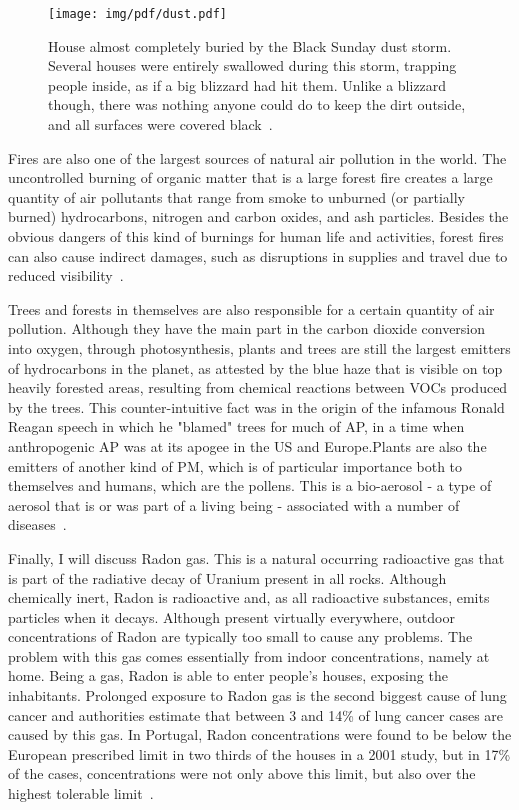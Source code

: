 \begin{figure}[htpb]
    \centering
    \texttt{[image: img/pdf/dust.pdf]}
        \caption{House almost completely buried by the Black Sunday dust
            storm. Several houses were entirely swallowed during this
            storm, trapping people inside, as if a big blizzard had hit
            them. Unlike a blizzard though, there was nothing anyone
            could do to keep the dirt outside, and all surfaces were
            covered black~\cite{Reis2008}.}
    \label{fig:dust1935}
\end{figure}

Fires are also one of the largest sources of natural air pollution in
the world. The uncontrolled burning of organic matter that is a large
forest fire creates a large quantity of air pollutants that range from
smoke to unburned (or partially burned) hydrocarbons, nitrogen and carbon
oxides, and ash particles. Besides the obvious dangers of this kind of
burnings for human life and activities, forest fires can also cause
indirect damages, such as disruptions in supplies and travel due to
reduced visibility~\cite{Vallero2014}.

Trees and forests in themselves are also responsible for a certain
quantity of air pollution. Although they have the main part in the
carbon dioxide conversion into oxygen, through photosynthesis, plants
and trees are still the largest emitters of hydrocarbons in the planet,
as attested by the blue haze that is visible on top heavily forested
areas, resulting from chemical reactions between \gls{VOC}s produced by
the trees. This counter-intuitive fact was in the origin of the infamous
Ronald Reagan speech in which he "blamed" trees for much of \gls{AP}, in
a time when anthropogenic \gls{AP} was at its apogee in the US and
Europe.Plants are also the emitters of another kind of \gls{PM}, which
is of particular importance both to themselves and humans, which are the
pollens. This is a bio-aerosol - a type of aerosol that is or was part
of a living being - associated with a number of
diseases~\cite{Vallero2014}.

Finally, I will discuss Radon gas. This is a natural occurring
radioactive gas that is part of the radiative decay of Uranium present
in all rocks. Although chemically inert, Radon is radioactive and, as
all radioactive substances, emits particles when it decays. Although
present virtually everywhere, outdoor concentrations of Radon are
typically too small to cause any problems. The problem with this gas
comes essentially from indoor concentrations, namely at home. Being a
gas, Radon is able to enter people's houses, exposing the inhabitants.
Prolonged exposure to Radon gas is the second biggest cause of lung
cancer and authorities estimate that between 3 and 14\% of lung cancer
cases are caused by this gas. In Portugal, Radon concentrations were
found to be below the European prescribed limit in two thirds of the
houses in a 2001 study, but in 17\% of the cases, concentrations were
not only above this limit, but also over the highest tolerable
limit~\cite{Vallero2014, WorldHealthOrganization2016, ProTeste2003}.


